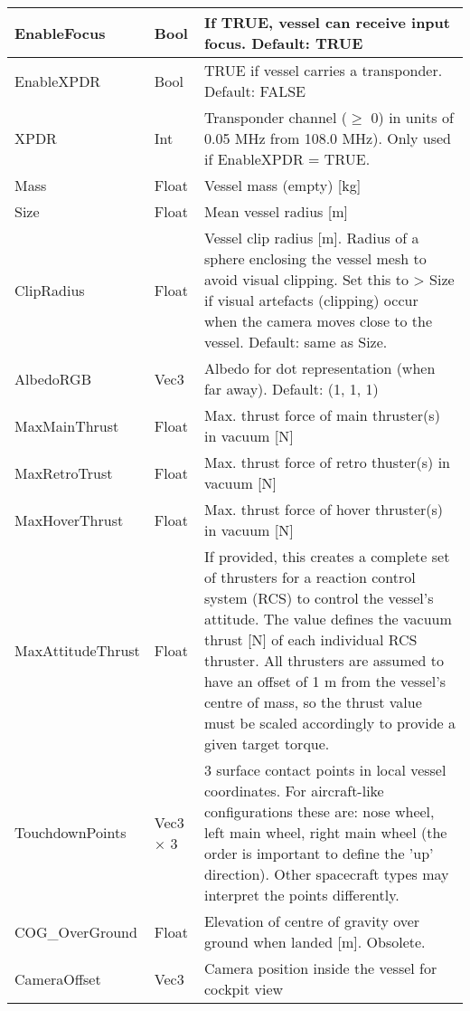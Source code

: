 \documentclass[Orbiter Developer Manual.tex]{subfiles}
\begin{document}
\begin{longtable}{ |p{}|p{}|p{}| }
	EnableFocus & Bool & If TRUE, vessel can receive input focus. Default: TRUE\\
	\hline\rule{0pt}{2ex}
	EnableXPDR & Bool & TRUE if vessel carries a transponder. Default: FALSE\\
	\hline\rule{0pt}{2ex}
	XPDR & Int & Transponder channel ($\geq$ 0) in units of 0.05 MHz from 108.0 MHz). Only used if EnableXPDR = TRUE.\\
	\hline\rule{0pt}{2ex}
	Mass & Float & Vessel mass (empty) [kg]\\
	\hline\rule{0pt}{2ex}
	Size & Float & Mean vessel radius [m]\\
	\hline\rule{0pt}{2ex}
	ClipRadius & Float & Vessel clip radius [m]. Radius of a sphere enclosing the vessel mesh to avoid visual clipping. Set this to > Size if visual artefacts (clipping) occur when the camera moves close to the vessel. Default: same as Size.\\
	\hline\rule{0pt}{2ex}
	AlbedoRGB & Vec3 & Albedo for dot representation (when far away). Default: (1, 1, 1)\\
	\hline\rule{0pt}{2ex}
	MaxMainThrust & Float & Max. thrust force of main thruster(s) in vacuum [N]\\
	\hline\rule{0pt}{2ex}
	MaxRetroTrust & Float & Max. thrust force of retro thuster(s) in vacuum [N]\\
	\hline\rule{0pt}{2ex}
	MaxHoverThrust & Float & Max. thrust force of hover thruster(s) in vacuum [N]\\
	\hline\rule{0pt}{2ex}
	MaxAttitudeThrust & Float & If provided, this creates a complete set of thrusters for a reaction control system (RCS) to control the vessel's attitude. The value defines the vacuum thrust [N] of each individual RCS thruster. All thrusters are assumed to have an offset of 1 m from the vessel's centre of mass, so the thrust value must be scaled accordingly to provide a given target torque.\\
	\hline\rule{0pt}{2ex}
	TouchdownPoints & Vec3 × 3 & 3 surface contact points in local vessel coordinates. For aircraft-like configurations these are: nose wheel, left main wheel, right main wheel (the order is important to define the 'up' direction). Other spacecraft types may interpret the points differently.\\
	\hline\rule{0pt}{2ex}
	COG\_OverGround & Float & Elevation of centre of gravity over ground when landed [m]. Obsolete.\\
	\hline\rule{0pt}{2ex}
	CameraOffset & Vec3 & Camera position inside the vessel for cockpit view\\

\end{longtable}
\end{document}
